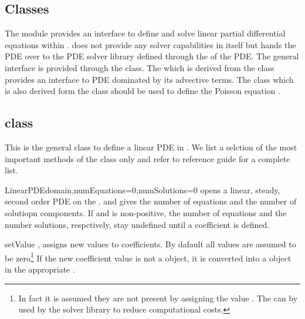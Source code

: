 \subsection{Classes}
The module \linearPDEs provides an interface to define and solve linear partial
differential equations within \escript. \linearPDEs does not provide any
solver capabilities in itself but hands the PDE over to
the PDE solver library defined through the \Domain of the PDE.
The general interface is provided through the \LinearPDE class. The
\AdvectivePDE which is derived from the \LinearPDE class
provides an interface to PDE dominated by its advective terms. The \Poisson
class which is also derived form the \LinearPDE class should be used
to define the Poisson equation .

\subsection{\LinearPDE class}
This is the general class to define a linear PDE in \escript. We list a selction of the most
important methods of the class only and refer to reference guide \ReferenceGuide for a complete list.

\begin{classdesc}{LinearPDE}{domain,numEquations=0,numSolutions=0}
opens a linear, steady, second order PDE on the \Domain {}. 
and  gives the number of equations and the number of solutiopn components.
If  and  is non-positive, the number of equations
and the number solutions, respctively, stay undefined until a coefficient is
defined.
\end{classdesc}

\begin{methoddesc}[LinearPDE]{setValue}{
,
}
assigns new values to coefficients. By dafault all values are assumed to be zero\footnote{
In fact it is assumed they are not present by assigning the value . The
can by used by the solver library to reduce computational costs.
}
If the new coefficient value is not a \Data object, it is converted into a \Data object in the
appropriate \FunctionSpace.
\end{methoddesc}

